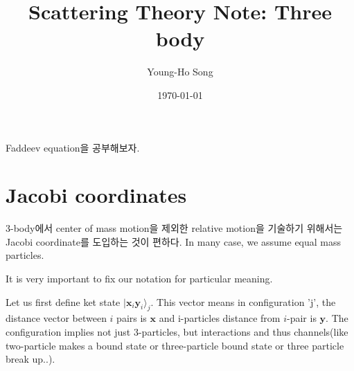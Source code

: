 \documentclass[11pt]{article}
\title{Scattering Theory Note: Three body}
\author{Young-Ho Song}
\date{\today}
\def\bm{\boldsymbol}
\newcommand{\vx}{{\bm x}}
\newcommand{\vy}{{\bm y}}
\newcommand{\ra}{\rangle}
\begin{document}
\maketitle

Faddeev equation을 공부해보자. 

\section{Jacobi coordinates }
3-body에서 center of mass motion을 제외한 relative motion을 기술하기 위해서는 
Jacobi coordinate를 도입하는 것이 편하다. In many case, we assume {\color{blue}equal mass} particles.

It is very important to fix our notation for particular meaning.

Let us first define ket state $|\vx_i \vy_i\ra_j$. This vector means
in configuration 'j', the distance vector between 
$i$ pairs is $\vx$ and i-particles distance from $i$-pair is $\vy$.
The configuration implies not just 3-particles, but interactions and 
thus channels(like two-particle makes a bound state or three-particle bound state or 
three particle break up..).
\end{document}
